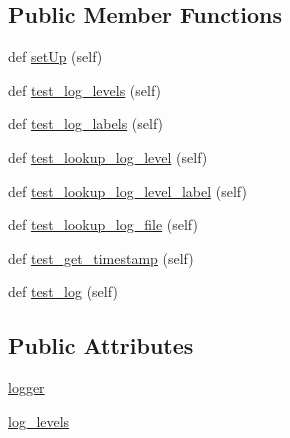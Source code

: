 \subsection*{Public Member Functions}
\begin{DoxyCompactItemize}
\item 
def \hyperlink{classNEAT__PyGenetics_1_1NEAT_1_1Tests_1_1LogginTests_1_1test__logger_1_1TestLogger_a77c020a3cc8651c0f72c671e6a5c743b}{set\+Up} (self)
\item 
def \hyperlink{classNEAT__PyGenetics_1_1NEAT_1_1Tests_1_1LogginTests_1_1test__logger_1_1TestLogger_a0b1d4cf73e5e14adbc57b4f11ba74989}{test\+\_\+log\+\_\+levels} (self)
\item 
def \hyperlink{classNEAT__PyGenetics_1_1NEAT_1_1Tests_1_1LogginTests_1_1test__logger_1_1TestLogger_a5ce9ae66dfb4b4e8e3e39acdb01f1565}{test\+\_\+log\+\_\+labels} (self)
\item 
def \hyperlink{classNEAT__PyGenetics_1_1NEAT_1_1Tests_1_1LogginTests_1_1test__logger_1_1TestLogger_aca0ac5df7e9320dee160373ffe3851e2}{test\+\_\+lookup\+\_\+log\+\_\+level} (self)
\item 
def \hyperlink{classNEAT__PyGenetics_1_1NEAT_1_1Tests_1_1LogginTests_1_1test__logger_1_1TestLogger_a069d654cfc8d29aef94cfb3037965d1a}{test\+\_\+lookup\+\_\+log\+\_\+level\+\_\+label} (self)
\item 
def \hyperlink{classNEAT__PyGenetics_1_1NEAT_1_1Tests_1_1LogginTests_1_1test__logger_1_1TestLogger_a720809c21ad8b54610674b3faa8d91cf}{test\+\_\+lookup\+\_\+log\+\_\+file} (self)
\item 
def \hyperlink{classNEAT__PyGenetics_1_1NEAT_1_1Tests_1_1LogginTests_1_1test__logger_1_1TestLogger_ab51462f3f6f4788823143a1ff1687313}{test\+\_\+get\+\_\+timestamp} (self)
\item 
def \hyperlink{classNEAT__PyGenetics_1_1NEAT_1_1Tests_1_1LogginTests_1_1test__logger_1_1TestLogger_aade1a9d41eb3507b7c054c531e308e59}{test\+\_\+log} (self)
\end{DoxyCompactItemize}
\subsection*{Public Attributes}
\begin{DoxyCompactItemize}
\item 
\hyperlink{classNEAT__PyGenetics_1_1NEAT_1_1Tests_1_1LogginTests_1_1test__logger_1_1TestLogger_acaa9869276882a1e8f820a766f5336e9}{logger}
\item 
\hyperlink{classNEAT__PyGenetics_1_1NEAT_1_1Tests_1_1LogginTests_1_1test__logger_1_1TestLogger_a50686c745b18eb916543061489b43508}{log\+\_\+levels}
\end{DoxyCompactItemize}


